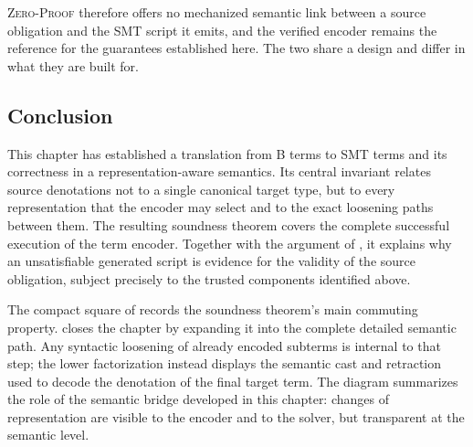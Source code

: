 \textsc{Zero-Proof} \beer{} therefore offers no mechanized semantic link between a source obligation and the SMT script it emits, and the verified encoder remains the reference for the guarantees established here.
The two share a design and differ in what they are built for.

\ifThesisAfive\else{}\fi
\subsection{Conclusion}
\label{sec:beer-conclusion}

This chapter has established a translation from B terms to SMT terms and its correctness in a representation-aware semantics.
Its central invariant relates source denotations not to a single canonical target type, but to every representation that the encoder may select and to the exact loosening paths between them.
The resulting soundness theorem covers the complete successful execution of the term encoder.
Together with the argument of , it explains why an unsatisfiable generated script is evidence for the validity of the source obligation, subject precisely to the trusted components identified above.

\begin{figure}[t]
  \centering
  
  \label{fig:beer-semantic-square-extended}
\end{figure}

The compact square of  records the soundness
theorem's main commuting property.
 closes the chapter by expanding it
into the complete detailed semantic path.
Any syntactic loosening of already encoded subterms is internal to that step;
the lower factorization instead displays the semantic cast and retraction used
to decode the denotation of the final target term.
The diagram summarizes the role of the semantic bridge developed in this chapter: changes of representation are visible to the encoder and to the solver, but transparent at the semantic level.
